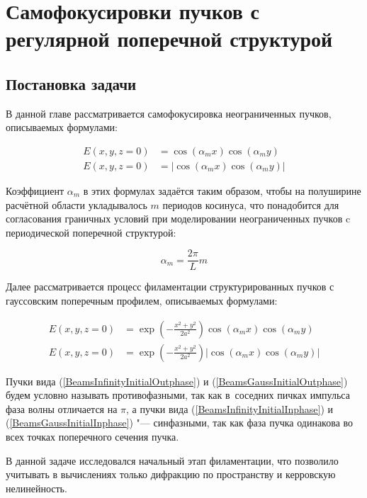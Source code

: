 \section{Самофокусировки пучков с регулярной поперечной структурой}
\label{sec:beams}

\subsection{Постановка задачи}

В данной главе рассматривается самофокусировка неограниченных пучков, описываемых формулами:

\begin{align}
    \label{BeamsInfinityInitialOutphase}
    E(x, y, z = 0) & = \cos(\alpha_m x) \cos(\alpha_m y) \\
    \label{BeamsInfinityInitialInphase}
    E(x, y, z = 0) & = \left| \cos(\alpha_m x) \cos(\alpha_m y) \right|
\end{align}

Коэффициент $\alpha_m$ в этих формулах задаётся таким образом, чтобы на полуширине расчётной области
укладывалось $m$ периодов косинуса, что понадобится для согласования граничных условий при моделировании
неограниченных пучков c периодической поперечной структурой:

\begin{equation}
    \alpha_m = \frac{2\pi}{L} m
\end{equation}

Далее рассматривается процесс филаментации структурированных пучков с гауссовским поперечным профилем, описываемых формулами:

\begin{align}
    \label{BeamsGaussInitialOutphase}
    E(x, y, z = 0) & = \exp \left( -\frac{x^2 + y^2}{2 a^2}\right) \cos(\alpha_m x) \cos(\alpha_m y) \\
    \label{BeamsGaussInitialInphase}
    E(x, y, z = 0) & = \exp \left( -\frac{x^2 + y^2}{2 a^2}\right) \left| \cos(\alpha_m x) \cos(\alpha_m y) \right|
\end{align}

Пучки вида (\ref{BeamsInfinityInitialOutphase}) и (\ref{BeamsGaussInitialOutphase}) будем условно называть противофазными,
так как в~соседних пичках импульса фаза волны отличается на $\pi$,
а пучки вида (\ref{BeamsInfinityInitialInphase}) и (\ref{BeamsGaussInitialInphase}) "--- синфазными,
так как фаза пучка одинакова во всех точках поперечного сечения пучка.


В данной задаче исследовался начальный этап филаментации, что позволило учитывать в вычислениях
только дифракцию по пространству и керровскую нелинейность.



